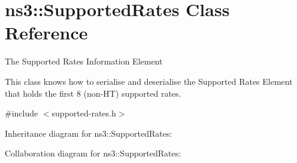 \hypertarget{classns3_1_1SupportedRates}{}\section{ns3\+:\+:Supported\+Rates Class Reference}
\label{classns3_1_1SupportedRates}


The Supported Rates Information Element

This class knows how to serialise and deserialise the Supported Rates Element that holds the first 8 (non-\/\+HT) supported rates.  




{\ttfamily \#include $<$supported-\/rates.\+h$>$}



Inheritance diagram for ns3\+:\+:Supported\+Rates\+:


Collaboration diagram for ns3\+:\+:Supported\+Rates\+:
